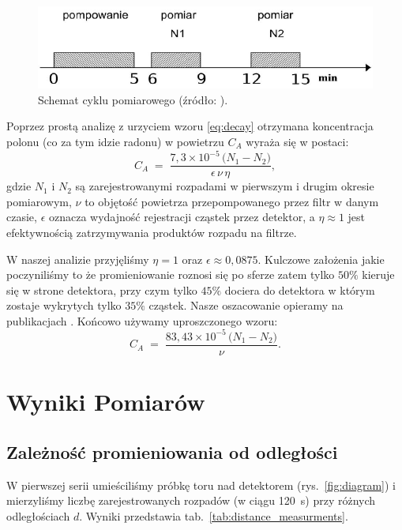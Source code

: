 \documentclass[12pt]{article}
\begin{document}
\begin{figure}[H]
	\centering
	\includegraphics[scale=0.7]{cycle}
	\caption{Schemat cyklu pomiarowego (źródło: \cite{skrypt}).}
	\label{fig:cycle}
\end{figure}

Poprzez prostą analizę z urzyciem wzoru \eqref{eq:decay} otrzymana koncentracja polonu (co za tym idzie radonu) w powietrzu \(C_A\) wyraża się w postaci:
\[
    C_A \;=\; \frac{7{,}3 \times 10^{-5}\,\bigl(N_1 - N_2\bigr)}{\epsilon\,\nu\,\eta},
\]
gdzie \(N_1\) i \(N_2\) są zarejestrowanymi rozpadami w pierwszym i drugim okresie pomiarowym, \(\nu\) to objętość powietrza przepompowanego przez filtr w danym czasie, \(\epsilon\) oznacza wydajność rejestracji cząstek przez detektor, a \(\eta\approx 1\) jest efektywnością zatrzymywania produktów rozpadu na filtrze.  

W naszej analizie przyjęliśmy \(\eta=1\) oraz \(\epsilon \approx 0{,}0875\). Kulczowe założenia jakie poczyniliśmy to że promieniowanie roznosi się po sferze zatem tylko \(50\%\) kieruje się w strone detektora, przy czym tylko \(45\%\) dociera do detektora w którym zostaje wykrytych tylko $35\%$ cząstek.
Nasze oszacowanie opieramy na publikacjach \cite{scynt,alpha_range}. Końcowo używamy uproszczonego wzoru:
\begin{equation}
    C_A \;=\; \frac{83{,}43 \times 10^{-5}\,\bigl(N_1 - N_2\bigr)}{\nu}.
    \label{eq:markov}
\end{equation}

\section{Wyniki Pomiarów}

\subsection{Zależność promieniowania od odległości}
W pierwszej serii umieściliśmy próbkę toru nad detektorem (rys.~\ref{fig:diagram}) i mierzyliśmy liczbę zarejestrowanych rozpadów (w ciągu 120~s) przy różnych odległościach \(d\). Wyniki przedstawia tab.~\ref{tab:distance_measurments}.
\end{document}
